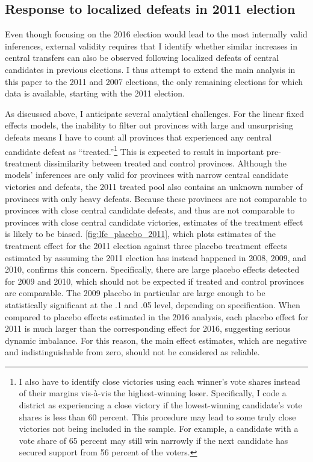 \documentclass[12pt]{article}
\newcommand\fnote[1]{\footnote{\baselineskip=2\normalbaselineskip#1}}
\newcommand{\1}{\mathbbm{1}}
\begin{document}
\subsection{Response to localized defeats in 2011 election}

Even though focusing on the 2016 election would lead to the most internally valid inferences, external validity requires that I identify whether similar increases in central transfers can also be observed following localized defeats of central candidates in previous elections. I thus attempt to extend the main analysis in this paper to the 2011 and 2007 elections, the only remaining elections for which data is available, starting with the 2011 election.

As discussed above, I anticipate several analytical challenges. For the linear fixed effects models, the inability to filter out provinces with large and unsurprising defeats means I have to count all provinces that experienced any central candidate defeat as ``treated.''\fnote{I also have to identify close victories using each winner's vote shares instead of their margins vis-\`{a}-vis the highest-winning loser. Specifically, I code a district as experiencing a close victory if the lowest-winning candidate's vote shares is less than 60 percent. This procedure may lead to some truly close victories not being included in the sample. For example, a candidate with a vote share of 65 percent may still win narrowly if the next candidate has secured support from 56 percent of the voters.} This is expected to result in important pre-treatment dissimilarity between treated and control provinces. Although the models' inferences are only valid for provinces with narrow central candidate victories and defeats, the 2011 treated pool also contains an unknown number of provinces with only heavy defeats. Because these provinces are not comparable to provinces with close central candidate defeats, and thus are not comparable to provinces with close central candidate victories, estimates of the treatment effect is likely to be biased. \autoref{fig:lfe_placebo_2011}, which plots estimates of the treatment effect for the 2011 election against three placebo treatment effects estimated by assuming the 2011 election has instead happened in 2008, 2009, and 2010, confirms this concern. Specifically, there are large placebo effects detected for 2009 and 2010, which should not be expected if treated and control provinces are comparable. The 2009 placebo in particular are large enough to be statistically significant at the .1 and .05 level, depending on specification. When compared to placebo effects estimated in the 2016 analysis, each placebo effect for 2011 is much larger than the corresponding effect for 2016, suggesting serious dynamic imbalance. For this reason, the main effect estimates, which are negative and indistinguishable from zero, should not be considered as reliable.
\end{document}
